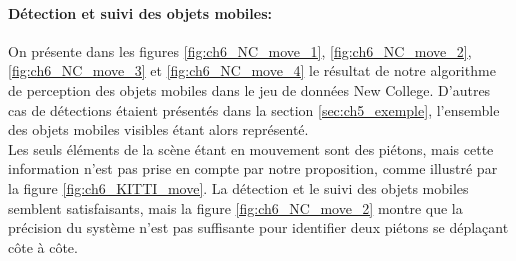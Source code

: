 \paragraph{Détection et suivi des objets mobiles:\\}
On présente dans les figures \ref{fig:ch6_NC_move_1}, \ref{fig:ch6_NC_move_2}, \ref{fig:ch6_NC_move_3} et \ref{fig:ch6_NC_move_4} le résultat de notre algorithme de perception des objets mobiles dans le jeu de données \og New College\fg{}. D'autres cas de détections étaient présentés dans la section \ref{sec:ch5_exemple}, l'ensemble des objets mobiles visibles étant alors représenté.\\
Les seuls éléments de la scène étant en mouvement sont des piétons, mais cette information n'est pas prise en compte par notre proposition, comme illustré par la figure \ref{fig:ch6_KITTI_move}. La détection et le suivi des objets mobiles semblent satisfaisants, mais la figure \ref{fig:ch6_NC_move_2} montre que la précision du système n'est pas suffisante pour identifier deux piétons se déplaçant côte à côte.

